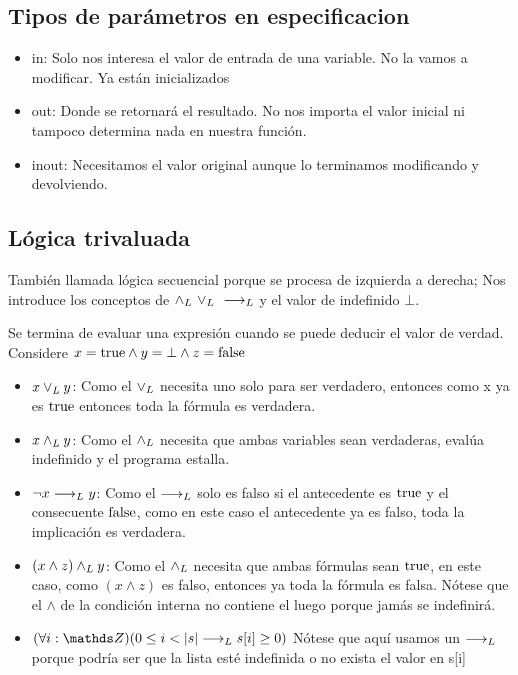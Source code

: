 \documentclass[10pt,a4paper]{article}
\begin{document}
\subsection*{Tipos de parámetros en especificacion}
\begin{itemize}
    \item in: Solo nos interesa el valor de entrada de una variable. No la vamos a modificar. Ya están inicializados
    \item out: Donde se retornará el resultado. No nos importa el valor inicial ni tampoco determina nada en nuestra función.
    \item inout: Necesitamos el valor original aunque lo terminamos modificando y devolviendo.
\end{itemize}
\subsection*{Lógica trivaluada}
También llamada lógica secuencial porque se procesa de izquierda a derecha; Nos introduce los conceptos de \(\land _L \ \lor _L \ \longrightarrow _L\) y el valor de indefinido \(\bot\).

Se termina de evaluar una expresión cuando se puede deducir el valor de verdad. \\


Considere \(x = \mathrm{true} \land y = \bot \land z = \mathrm{false} \)
\begin{itemize}
    \item \(x \lor _L y\): Como el \(\lor _L\) necesita uno solo para ser verdadero, entonces como x ya es \(\mathrm{true}\) entonces toda la fórmula es verdadera.
    \item \(x \land _L y\): Como el \(\land _L\) necesita que ambas variables sean verdaderas, evalúa indefinido y el programa estalla.
    \item \(\neg x \longrightarrow _L y\): Como el \(\longrightarrow _L\) solo es falso si el antecedente es  \(\mathrm{true}\) y el consecuente \(\mathrm{false}\), como en este caso el antecedente ya es falso, toda la implicación es verdadera.
    \item \((x \land z) \land _L y\): Como el \(\land _L\) necesita que ambas fórmulas sean \(\mathrm{true}\), en este caso, como \((x \land z)\) es falso, entonces ya toda la fórmula es falsa. Nótese que el \(\land\) de la condición interna no contiene el luego porque jamás se indefinirá.
    \item \((\forall i: \ent)(0 \le i < \longitud{s} \implicaLuego s[i] \ge 0)\) Nótese que aquí usamos un \(\longrightarrow _L\) porque podría ser que la lista esté indefinida o no exista el valor en s[i]
\end{itemize}
\end{document}
